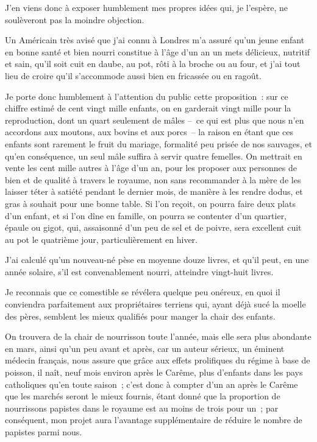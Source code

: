 \documentclass[french,twoside]{book} %
\begin{document}
J’en viens donc à exposer humblement mes propres idées qui, je l’espère, ne soulèveront pas la moindre objection.\par
Un Américain très avisé que j’ai connu à Londres m’a assuré qu’un jeune enfant en bonne santé et bien nourri constitue à l’âge d’un an un mets délicieux, nutritif et sain, qu’il soit cuit en daube, au pot, rôti à la broche ou au four, et j’ai tout lieu de croire qu’il s’accommode aussi bien en fricassée ou en ragoût.\par
Je porte donc humblement à l’attention du public cette proposition : sur ce chiffre estimé de cent vingt mille enfants, on en garderait vingt mille pour la reproduction, dont un quart seulement de mâles – ce qui est plus que nous n’en accordons aux moutons, aux bovins et aux porcs – la raison en étant que ces enfants sont rarement le fruit du mariage, formalité peu prisée de nos sauvages, et qu’en conséquence, un seul mâle suffira à servir quatre femelles. On mettrait en vente les cent mille autres à l’âge d’un an, pour les proposer aux personnes de bien et de qualité à travers le royaume, non sans recommander à la mère de les laisser téter à satiété pendant le dernier mois, de manière à les rendre dodus, et gras à souhait pour une bonne table. Si l’on reçoit, on pourra faire deux plats d’un enfant, et si l’on dîne en famille, on pourra se contenter d’un quartier, épaule ou gigot, qui, assaisonné d’un peu de sel et de poivre, sera excellent cuit au pot le quatrième jour, particulièrement en hiver.\par
J’ai calculé qu’un nouveau-né pèse en moyenne douze livres, et qu’il peut, en une année solaire, s’il est convenablement nourri, atteindre vingt-huit livres.\par
Je reconnais que ce comestible se révélera quelque peu onéreux, en quoi il conviendra parfaitement aux propriétaires terriens qui, ayant déjà sucé la moelle des pères, semblent les mieux qualifiés pour manger la chair des enfants.\par
On trouvera de la chair de nourrisson toute l’année, mais elle sera plus abondante en mars, ainsi qu’un peu avant et après, car un auteur sérieux, un éminent médecin français, nous assure que grâce aux effets prolifiques du régime à base de poisson, il naît, neuf mois environ après le Carême, plus d’enfants dans les pays catholiques qu’en toute saison ; c’est donc à compter d’un an après le Carême que les marchés seront le mieux fournis, étant donné que la proportion de nourrissons papistes dans le royaume est au moins de trois pour un ; par conséquent, mon projet aura l’avantage supplémentaire de réduire le nombre de papistes parmi nous.\par
\end{document}
